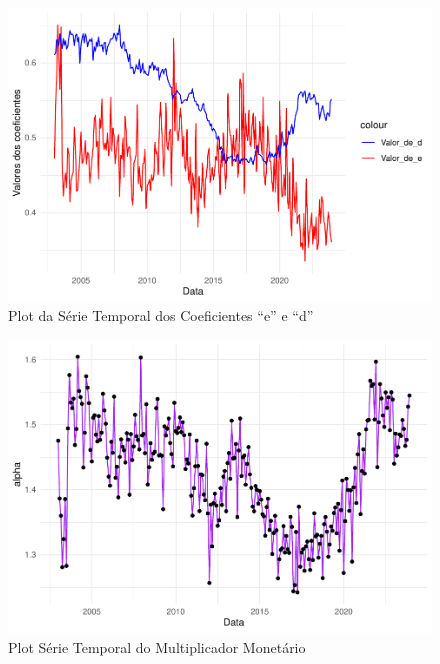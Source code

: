 \documentclass[12pt]{article}
\begin{document}
\begin{figure}
\centering
\includegraphics{multiplicador_files/figure-latex/unnamed-chunk-8-1.pdf}
\caption{Plot da Série Temporal dos Coeficientes ``e'' e ``d''}
\end{figure}

\begin{figure}
\centering
\includegraphics{multiplicador_files/figure-latex/unnamed-chunk-9-1.pdf}
\caption{Plot Série Temporal do Multiplicador Monetário}
\end{figure}
\end{document}
